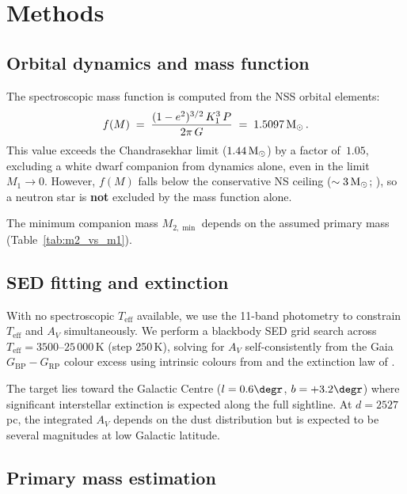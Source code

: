 \documentclass[usenatbib,fleqn]{mnras}
\newcommand{\Msun}{{\rm M}_\odot}
\newcommand{\fmass}{f(M)}
\begin{document}
\section{Methods}
\label{sec:methods}

\subsection{Orbital dynamics and mass function}
\label{sec:methods:orbit}

The spectroscopic mass function is computed from the NSS orbital
elements:
\begin{equation}
\fmass \;=\; \frac{(1 - e^2)^{3/2}\, K_1^3\, P}{2\pi\, G}
     \;=\; 1.5097\,\Msun \,.
\label{eq:fm}
\end{equation}
This value exceeds the Chandrasekhar limit ($1.44\,\Msun$) by a
factor of~$1.05$, excluding a white dwarf companion from dynamics
alone, even in the limit $M_1 \to 0$.  However, $\fmass$ falls
below the conservative NS ceiling ($\sim 3\,\Msun$;
\citealt{Rezzolla2018}), so a neutron star is \textbf{not} excluded
by the mass function alone.

The minimum companion mass $M_{2,\min}$ depends on the assumed
primary mass (Table~\ref{tab:m2_vs_m1}).

\subsection{SED fitting and extinction}
\label{sec:methods:sed}

With no spectroscopic $T_\mathrm{eff}$ available, we use the
11-band photometry to constrain $T_\mathrm{eff}$ and $A_V$
simultaneously.  We perform a blackbody SED grid search across
$T_\mathrm{eff} = 3500$--$25\,000$\,K (step 250\,K), solving for
$A_V$ self-consistently from the Gaia $G_\mathrm{BP} -
G_\mathrm{RP}$ colour excess using intrinsic colours from
\citet{PecautMamajek2013} and the extinction law of
\citet{Cardelli1989}.

The target lies toward the Galactic Centre ($l = 0.6\degr$,
$b = +3.2\degr$) where significant interstellar extinction is
expected along the full sightline.  At $d = 2527$\,pc, the
integrated $A_V$ depends on the dust distribution but is
expected to be several magnitudes at low Galactic latitude.

\subsection{Primary mass estimation}
\label{sec:methods:m1}
\end{document}
